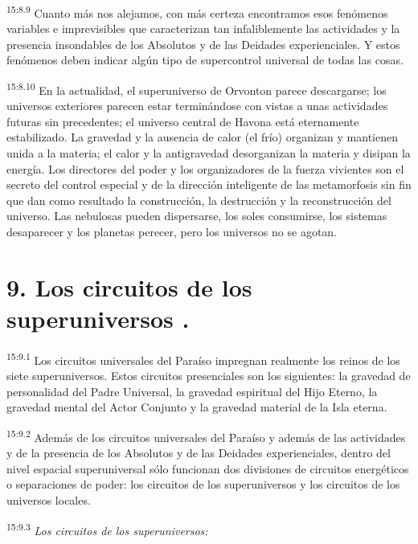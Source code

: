 \par
\textsuperscript{15:8.9} Cuanto más nos alejamos, con más certeza encontramos esos fenómenos variables e imprevisibles que caracterizan tan infaliblemente las actividades y la presencia insondables de los Absolutos y de las Deidades experienciales. Y estos fenómenos deben indicar algún tipo de supercontrol universal de todas las cosas.

\par
\textsuperscript{15:8.10} En la actualidad, el superuniverso de Orvonton parece descargarse; los universos exteriores parecen estar terminándose con vistas a unas actividades futuras sin precedentes; el universo central de Havona está eternamente estabilizado. La gravedad y la ausencia de calor (el frío) organizan y mantienen unida a la materia; el calor y la antigravedad desorganizan la materia y disipan la energía. Los directores del poder y los organizadores de la fuerza vivientes son el secreto del control especial y de la dirección inteligente de las metamorfosis sin fin que dan como resultado la construcción, la destrucción y la reconstrucción del universo. Las nebulosas pueden dispersarse, los soles consumirse, los sistemas desaparecer y los planetas perecer, pero los universos no se agotan.

\section*{9. Los circuitos de los superuniversos .}
\par
\textsuperscript{15:9.1} Los circuitos universales del Paraíso impregnan realmente los reinos de los siete superuniversos. Estos circuitos presenciales son los siguientes: la gravedad de personalidad del Padre Universal, la gravedad espiritual del Hijo Eterno, la gravedad mental del Actor Conjunto y la gravedad material de la Isla eterna.

\par
\textsuperscript{15:9.2} Además de los circuitos universales del Paraíso y además de las actividades y de la presencia de los Absolutos y de las Deidades experienciales, dentro del nivel espacial superuniversal sólo funcionan dos divisiones de circuitos energéticos o separaciones de poder: los circuitos de los superuniversos y los circuitos de los universos locales.

\par
\textsuperscript{15:9.3} \textit{Los circuitos de los superuniversos:}

